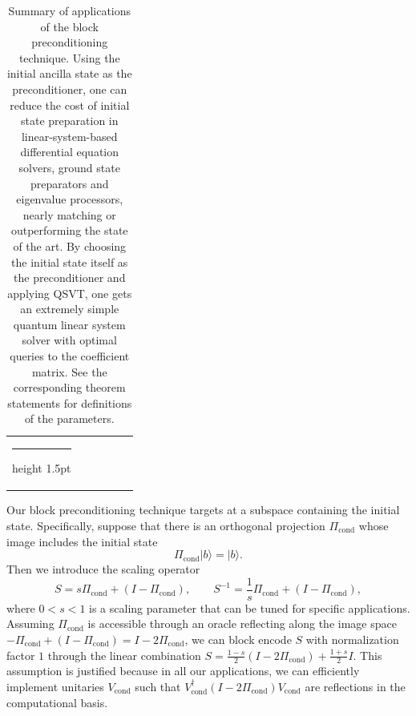 \documentclass[letterpaper,onecolumn,11pt,accepted=2026-02-14]{quantumarticle}
\makeatletter
\theoremstyle{remark}
\theoremstyle{plain}
\newcommand{\ket}[1]{|#1\rangle}
\newcommand{\thickhline}{%
    \noalign {\ifnum 0=`}\fi \hrule height 1.5pt
    \futurelet \reserved@a \@xhline
}
\makeatother
\begin{document}
\begin{table}[t]
{\begin{tabular}{cccccc}
    \tabularnewline
    \thickhline
    \end{tabular}
}
\caption{Summary of applications of the block preconditioning technique. Using the initial ancilla state as the preconditioner, one can reduce the cost of initial state preparation in linear-system-based differential equation solvers, ground state preparators and eigenvalue processors, nearly matching or outperforming the state of the art. By choosing the initial state itself as the preconditioner and applying QSVT, one gets an extremely simple quantum linear system solver with optimal queries to the coefficient matrix.
See the corresponding theorem statements for definitions of the parameters.
}
\label{tab:precond}
\end{table}

Our block preconditioning technique targets at a subspace containing the initial state. Specifically, suppose that there is an orthogonal projection $\Pi_{\text{cond}}$ whose image includes the initial state
\begin{equation}
    \Pi_{\text{cond}}\ket{b}=\ket{b}.
\end{equation}
Then we introduce the scaling operator
\begin{equation}
    S=s\Pi_{\text{cond}}+\left(I-\Pi_{\text{cond}}\right),\qquad
    S^{-1}=\frac{1}{s}\Pi_{\text{cond}}+\left(I-\Pi_{\text{cond}}\right),
\end{equation}
where $0<s<1$ is a scaling parameter that can be tuned for specific applications.
Assuming $\Pi_{\text{cond}}$ is accessible through an oracle reflecting along the image space $-\Pi_{\text{cond}}+\left(I-\Pi_{\text{cond}}\right)
    =I-2\Pi_{\text{cond}}$,
we can block encode $S$ with normalization factor $1$ through the linear combination
$S=\frac{1-s}{2}\left(I-2\Pi_{\text{cond}}\right)
    +\frac{1+s}{2}
    I$.
This assumption is justified because in all our applications, we can efficiently implement unitaries $V_{\text{cond}}$ such that $V_{\text{cond}}^\dagger\left(I-2\Pi_{\text{cond}}\right)V_{\text{cond}}$ are reflections in the computational basis.
\end{document}
